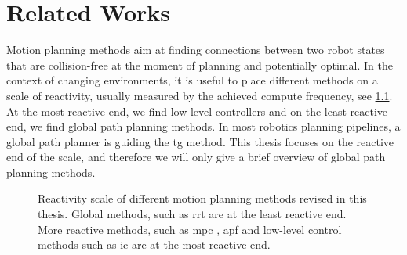\chapter{Related Works} %
\label{cha:state}

\blfootnote{
  \partscontentfootnote
  \begin{itemize}
    \item \trodynamic
    \item \icraautotuning
    \item \icracoupled
  \end{itemize}
}





\newpage


Motion planning methods aim at finding connections between two
robot states
that are collision-free at the
moment of planning and potentially optimal.
In the context of changing environments, 
it is useful to place different methods
on a scale of reactivity, usually measured by the achieved
compute frequency, see \cref{fig:reactivity_scale}.
At the most reactive end, we find low
level controllers and on the least reactive end, we find
global path planning methods. In most robotics planning
pipelines, a global path planner is guiding the 
\ac{tg} method.
This thesis focuses on the reactive end of the scale, and
therefore we will only give a brief overview of global path
planning methods. 
%
\begin{figure}[ht]
  \centering
  
  \caption{Reactivity scale of different motion planning methods
  revised in this thesis. Global methods, such as \ac{rrt}
  \cite{Karaman2011} are at the least reactive end. More
  reactive methods, such as \ac{mpc}
  \cite{hewing2020learning}, \ac{apf} \cite{Khatib1985} and
  low-level control methods such as \ac{ic} \cite{hogan1985impedance}
  are at the most reactive end.}
  \label{fig:reactivity_scale}
\end{figure}


